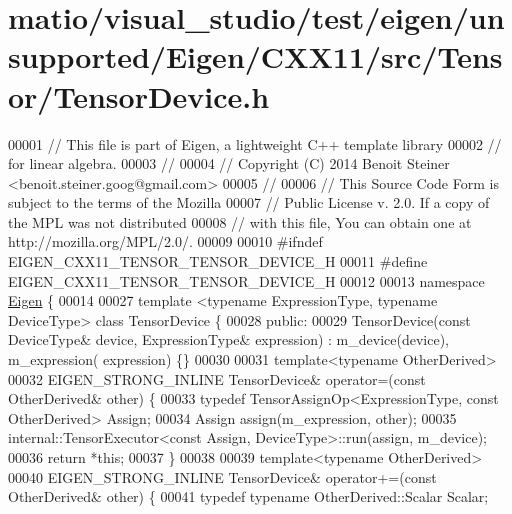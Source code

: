 \hypertarget{matio_2visual__studio_2test_2eigen_2unsupported_2_eigen_2_c_x_x11_2src_2_tensor_2_tensor_device_8h_source}{}\section{matio/visual\+\_\+studio/test/eigen/unsupported/\+Eigen/\+C\+X\+X11/src/\+Tensor/\+Tensor\+Device.h}
\label{matio_2visual__studio_2test_2eigen_2unsupported_2_eigen_2_c_x_x11_2src_2_tensor_2_tensor_device_8h_source}

\begin{DoxyCode}
00001 \textcolor{comment}{// This file is part of Eigen, a lightweight C++ template library}
00002 \textcolor{comment}{// for linear algebra.}
00003 \textcolor{comment}{//}
00004 \textcolor{comment}{// Copyright (C) 2014 Benoit Steiner <benoit.steiner.goog@gmail.com>}
00005 \textcolor{comment}{//}
00006 \textcolor{comment}{// This Source Code Form is subject to the terms of the Mozilla}
00007 \textcolor{comment}{// Public License v. 2.0. If a copy of the MPL was not distributed}
00008 \textcolor{comment}{// with this file, You can obtain one at http://mozilla.org/MPL/2.0/.}
00009 
00010 \textcolor{preprocessor}{#ifndef EIGEN\_CXX11\_TENSOR\_TENSOR\_DEVICE\_H}
00011 \textcolor{preprocessor}{#define EIGEN\_CXX11\_TENSOR\_TENSOR\_DEVICE\_H}
00012 
00013 \textcolor{keyword}{namespace }\hyperlink{namespace_eigen}{Eigen} \{
00014 
00027 \textcolor{keyword}{template} <\textcolor{keyword}{typename} ExpressionType, \textcolor{keyword}{typename} DeviceType> \textcolor{keyword}{class }TensorDevice \{
00028   \textcolor{keyword}{public}:
00029     TensorDevice(\textcolor{keyword}{const} DeviceType& device, ExpressionType& expression) : m\_device(device), m\_expression(
      expression) \{\}
00030 
00031     \textcolor{keyword}{template}<\textcolor{keyword}{typename} OtherDerived>
00032     EIGEN\_STRONG\_INLINE TensorDevice& operator=(\textcolor{keyword}{const} OtherDerived& other) \{
00033       \textcolor{keyword}{typedef} TensorAssignOp<ExpressionType, const OtherDerived> Assign;
00034       Assign assign(m\_expression, other);
00035       internal::TensorExecutor<const Assign, DeviceType>::run(assign, m\_device);
00036       \textcolor{keywordflow}{return} *\textcolor{keyword}{this};
00037     \}
00038 
00039     \textcolor{keyword}{template}<\textcolor{keyword}{typename} OtherDerived>
00040     EIGEN\_STRONG\_INLINE TensorDevice& operator+=(\textcolor{keyword}{const} OtherDerived& other) \{
00041       \textcolor{keyword}{typedef} \textcolor{keyword}{typename} OtherDerived::Scalar Scalar;

\end{DoxyCode}
